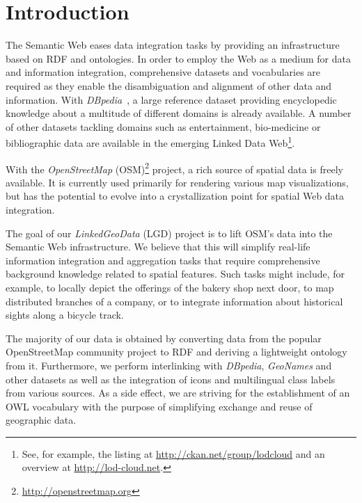 
\section{Introduction}
\label{introduction}
The Semantic Web eases data integration tasks by providing an
infrastructure based on RDF and ontologies.
In order to employ the Web as a medium for data and information integration,
comprehensive datasets and vocabularies are required as they enable the
disambiguation and alignment of other data and information.
With \textit{DBpedia}~\cite{dbpedia_jws_09}, a large reference dataset
providing encyclopedic knowledge about a multitude of different domains is
already available. A number of other datasets tackling domains such as
entertainment, bio-medicine or bibliographic data are available in the emerging
Linked Data Web\footnote{See, for example, the listing at \url{http://ckan.net/group/lodcloud}
and an overview at \url{http://lod-cloud.net}.}.

With the \textit{OpenStreetMap} (OSM)\footnote{\url{http://openstreetmap.org}}
project, a rich source of spatial data is freely available.
It is currently used primarily for rendering various map visualizations, but has
the potential to evolve into a crystallization point for spatial Web data integration. 

The goal of our \textit{LinkedGeoData} (LGD) project is to lift OSM's data into
the Semantic Web infrastructure. We believe that this will 
simplify real-life information integration and aggregation tasks that require
comprehensive background knowledge related to spatial features.
Such tasks might
include, for example, to locally depict the offerings of the bakery shop next door, to map distributed
branches of a company, or to integrate information about historical sights along
a bicycle track.

The majority of our
data is obtained by converting data from the popular OpenStreetMap community project
to RDF and deriving a lightweight ontology from it. Furthermore, we perform interlinking
with \textit{DBpedia}, \textit{GeoNames} and other datasets as well as the
integration of icons and multilingual class labels from various sources.
As a side effect, we are striving for the establishment of an OWL vocabulary with the
purpose of simplifying exchange and reuse of geographic data.

